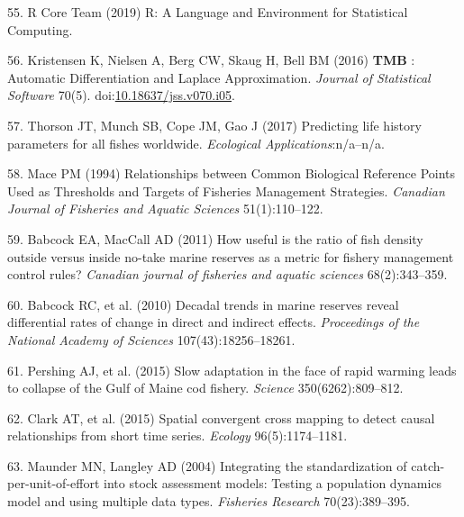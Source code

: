 \documentclass[9pt,twocolumn,twoside,lineno]{pnas-new}
\begin{document}
\leavevmode\hypertarget{ref-rcoreteam2019}{}%
55. R Core Team (2019) R: A Language and Environment for Statistical
Computing.

\leavevmode\hypertarget{ref-kristensen2016}{}%
56. Kristensen K, Nielsen A, Berg CW, Skaug H, Bell BM (2016)
\textbf{TMB} : Automatic Differentiation and Laplace Approximation.
\emph{Journal of Statistical Software} 70(5).
doi:\href{https://doi.org/10.18637/jss.v070.i05}{10.18637/jss.v070.i05}.

\leavevmode\hypertarget{ref-thorson2017c}{}%
57. Thorson JT, Munch SB, Cope JM, Gao J (2017) Predicting life history
parameters for all fishes worldwide. \emph{Ecological
Applications}:n/a--n/a.

\leavevmode\hypertarget{ref-mace1994}{}%
58. Mace PM (1994) Relationships between Common Biological Reference
Points Used as Thresholds and Targets of Fisheries Management
Strategies. \emph{Canadian Journal of Fisheries and Aquatic Sciences}
51(1):110--122.

\leavevmode\hypertarget{ref-babcock2011}{}%
59. Babcock EA, MacCall AD (2011) How useful is the ratio of fish
density outside versus inside no-take marine reserves as a metric for
fishery management control rules? \emph{Canadian journal of fisheries
and aquatic sciences} 68(2):343--359.

\leavevmode\hypertarget{ref-babcock2010}{}%
60. Babcock RC, et al. (2010) Decadal trends in marine reserves reveal
differential rates of change in direct and indirect effects.
\emph{Proceedings of the National Academy of Sciences}
107(43):18256--18261.

\leavevmode\hypertarget{ref-pershing2015a}{}%
61. Pershing AJ, et al. (2015) Slow adaptation in the face of rapid
warming leads to collapse of the Gulf of Maine cod fishery.
\emph{Science} 350(6262):809--812.

\leavevmode\hypertarget{ref-clark2015}{}%
62. Clark AT, et al. (2015) Spatial convergent cross mapping to detect
causal relationships from short time series. \emph{Ecology}
96(5):1174--1181.

\leavevmode\hypertarget{ref-maunder2004}{}%
63. Maunder MN, Langley AD (2004) Integrating the standardization of
catch-per-unit-of-effort into stock assessment models: Testing a
population dynamics model and using multiple data types. \emph{Fisheries
Research} 70(23):389--395.



% 
\end{document}
